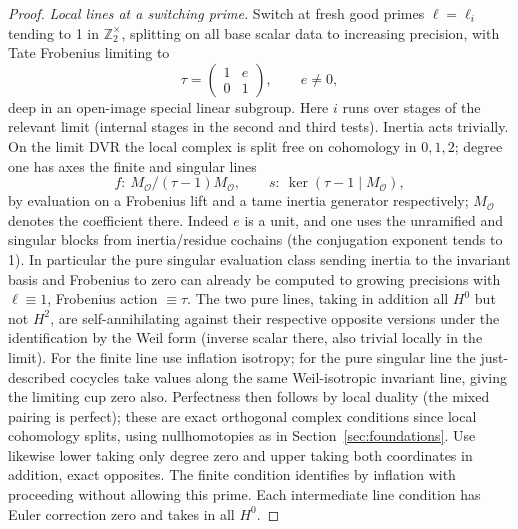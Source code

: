 \begin{proof}
\emph{Local lines at a switching prime.}
Switch at fresh good primes \(\ell=\ell_i\) tending to 1 in \(\mathbb Z_2^\times\), splitting on all base scalar data to increasing precision, with Tate Frobenius limiting to
\[
                \tau=\begin{pmatrix}1&e\\0&1\end{pmatrix},\qquad e\ne0,
\]
deep in an open-image special linear subgroup. Here \(i\) runs over stages of the relevant limit (internal stages in the second and third tests). Inertia acts trivially. On the limit DVR the local complex is split free on cohomology in \(0,1,2\); degree one has axes the finite and singular lines
\[
       f:\ M_{\mathscr O}/(\tau-1)M_{\mathscr O},\qquad
       s:\ \ker(\tau-1\mid M_{\mathscr O}),
\]
by evaluation on a Frobenius lift and a tame inertia generator respectively; \(M_{\mathscr O}\) denotes the coefficient there. Indeed \(e\) is a unit, and one uses the unramified and singular blocks from inertia/residue cochains (the conjugation exponent tends to 1). In particular the pure singular evaluation class sending inertia to the invariant basis and Frobenius to zero can already be computed to growing precisions with \(\ell\equiv1\), Frobenius action \(\equiv\tau\). The two pure lines, taking in addition all \(H^0\) but not \(H^2\), are self-annihilating against their respective opposite versions under the identification by the Weil form (inverse scalar there, also trivial locally in the limit). For the finite line use inflation isotropy; for the pure singular line the just-described cocycles take values along the same Weil-isotropic invariant line, giving the limiting cup zero also. Perfectness then follows by local duality (the mixed pairing is perfect); these are exact orthogonal complex conditions since local cohomology splits, using nullhomotopies as in Section~\ref{sec:foundations}. Use likewise lower taking only degree zero and upper taking both coordinates in addition, exact opposites. The finite condition identifies by inflation with proceeding without allowing this prime. Each intermediate line condition has Euler correction zero and takes in all \(H^0\).


\end{proof}
